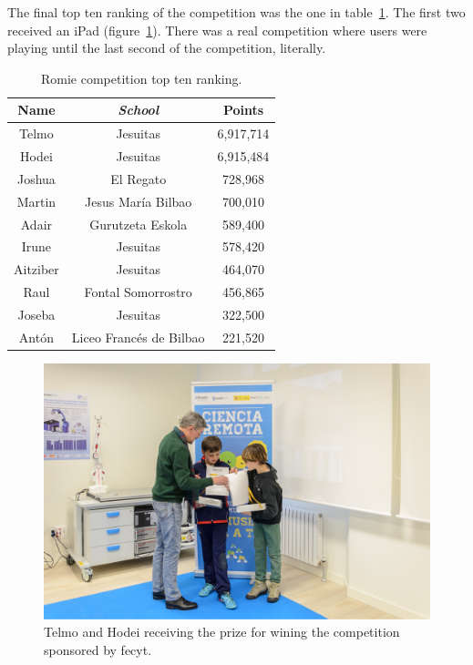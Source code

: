 The final top ten ranking of the competition was the one in table~\ref{tab:ranking}. The first two
received an iPad (figure~\ref{fig:prizes}). There was a real competition where users were playing
until the last second of the competition, literally.

\begin{table}[ht]
	\centering
	\caption{Romie competition top ten ranking.}\label{tab:ranking}
	\begin{tabular}{ccc}
		\toprule
		\textbf{Name} & \emph{School} & \textbf{Points} \\
		\midrule
		Telmo		& Jesuitas					& 6,917,714	\\
		Hodei		& Jesuitas					& 6,915,484	\\
		Joshua		& El Regato					& 728,968	\\
		Martin		& Jesus María Bilbao		& 700,010	\\
		Adair		& Gurutzeta Eskola			& 589,400	\\
		Irune		& Jesuitas					& 578,420	\\
		Aitziber	& Jesuitas					& 464,070	\\
		Raul		& Fontal Somorrostro		& 456,865	\\
		Joseba		& Jesuitas					& 322,500	\\
		Antón		& Liceo Francés de Bilbao	& 221,520	\\
		\bottomrule
	\end{tabular}
\end{table}

\begin{figure}[ht]
	\centering
	\includegraphics[height=0.3\textheight]{fig/prizes}
	\caption{Telmo and Hodei receiving the prize for wining the competition sponsored by \acrshort{fecyt}.}
	\label{fig:prizes}
\end{figure}


